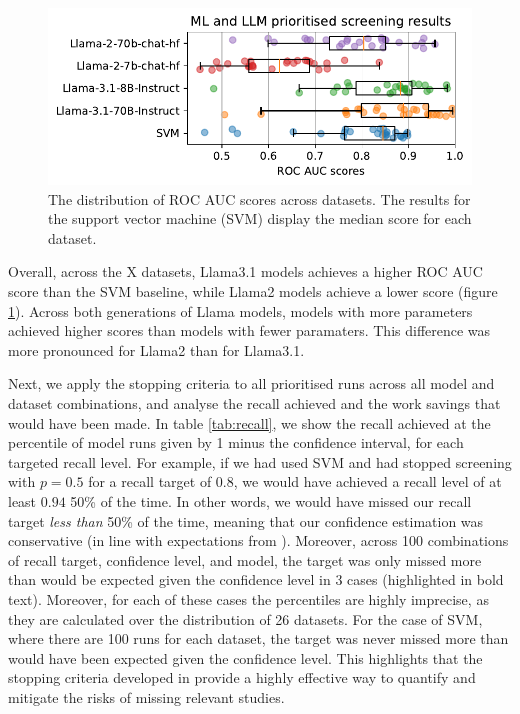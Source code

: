 \documentclass{article}
\begin{document}
\begin{figure}
	\includegraphics[width=\columnwidth]{../../figures/macro_comparison.pdf}
	\caption{The distribution of ROC AUC scores across datasets. The results for the support vector machine (SVM) display the median score for each dataset.}
	\label{fig:macro}
\end{figure}

\begin{table}
	\centering
	
	\caption{Recall achieved at the 1-confidence percentile across model runs. Values below the recall target are highlighted in bold.}
	\label{tab:recall}
\end{table}

	
	
	Overall, across the X datasets, Llama3.1 models achieves a higher ROC AUC score than the SVM baseline, while Llama2 models achieve a lower score (figure \ref{fig:macro}). Across both generations of Llama models, models with more parameters achieved higher scores than models with fewer paramaters. This difference was more pronounced for Llama2 than for Llama3.1. 
	
	Next, we apply the stopping criteria to all prioritised runs across all model and dataset combinations, and analyse the recall achieved and the work savings that would have been made. In table \ref{tab:recall}, we show the recall achieved at the percentile of model runs given by 1 minus the confidence interval, for each targeted recall level. 
	For example, if we had used SVM and had stopped screening with $p=0.5$ for a recall target of $0.8$, we would have achieved a recall level of at least $0.94$ 50\% of the time. In other words, we would have missed our recall target \textit{less than} 50\% of the time, meaning that our confidence estimation was conservative (in line with expectations from \cite{callaghan_statistical_2020}).
	Moreover, across 100 combinations of recall target, confidence level, and model, the target was only missed more than would be expected given the confidence level in 3 cases (highlighted in bold text). Moreover, for each of these cases the percentiles are highly imprecise, as they are calculated over the distribution of 26 datasets. For the case of SVM, where there are 100 runs for each dataset, the target was never missed more than would have been expected given the confidence level. This highlights that the stopping criteria developed in \cite{callaghan_statistical_2020} provide a highly effective way to quantify and mitigate the risks of missing relevant studies.
	
\end{document}
